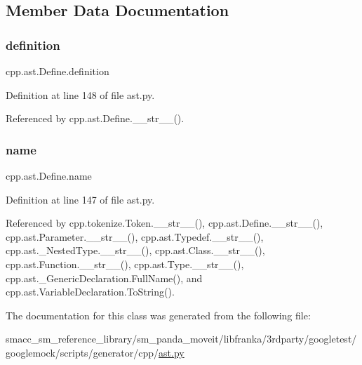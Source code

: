 \subsection{Member Data Documentation}
\mbox{\label{classcpp_1_1ast_1_1Define_a0c636652dfeb2f15e62793afea1153c9}} 
\subsubsection{\texorpdfstring{definition}{definition}}
{\footnotesize\ttfamily cpp.\+ast.\+Define.\+definition}



Definition at line 148 of file ast.\+py.



Referenced by cpp.\+ast.\+Define.\+\_\+\+\_\+str\+\_\+\+\_\+().

\mbox{\label{classcpp_1_1ast_1_1Define_a8879216f09e88f79d7baa49bcfa10ebd}} 
\subsubsection{\texorpdfstring{name}{name}}
{\footnotesize\ttfamily cpp.\+ast.\+Define.\+name}



Definition at line 147 of file ast.\+py.



Referenced by cpp.\+tokenize.\+Token.\+\_\+\+\_\+str\+\_\+\+\_\+(), cpp.\+ast.\+Define.\+\_\+\+\_\+str\+\_\+\+\_\+(), cpp.\+ast.\+Parameter.\+\_\+\+\_\+str\+\_\+\+\_\+(), cpp.\+ast.\+Typedef.\+\_\+\+\_\+str\+\_\+\+\_\+(), cpp.\+ast.\+\_\+\+Nested\+Type.\+\_\+\+\_\+str\+\_\+\+\_\+(), cpp.\+ast.\+Class.\+\_\+\+\_\+str\+\_\+\+\_\+(), cpp.\+ast.\+Function.\+\_\+\+\_\+str\+\_\+\+\_\+(), cpp.\+ast.\+Type.\+\_\+\+\_\+str\+\_\+\+\_\+(), cpp.\+ast.\+\_\+\+Generic\+Declaration.\+Full\+Name(), and cpp.\+ast.\+Variable\+Declaration.\+To\+String().



The documentation for this class was generated from the following file\+:\begin{DoxyCompactItemize}
\item 
smacc\+\_\+sm\+\_\+reference\+\_\+library/sm\+\_\+panda\+\_\+moveit/libfranka/3rdparty/googletest/googlemock/scripts/generator/cpp/\hyperlink{ast_8py}{ast.\+py}\end{DoxyCompactItemize}
